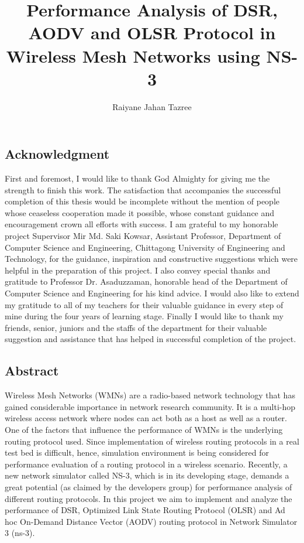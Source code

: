 \documentclass[12pt,a4paper]{report}
\author{Raiyane Jahan Tazree}
\title{Performance Analysis of DSR, AODV and OLSR Protocol in Wireless Mesh Networks  using NS-3}
\begin{document}
\maketitle
\tableofcontents
\listoffigures

\newpage
\begin{center}
\section*{Acknowledgment}
\justify
First and foremost, I would like to thank God Almighty for giving me the strength to finish this work. The satisfaction that accompanies the successful completion of this thesis would be incomplete without the mention of people whose ceaseless cooperation made it possible, whose constant guidance and encouragement crown all efforts with success. I am grateful to my honorable project Supervisor Mir Md. Saki Kowsar, Assistant Professor, Department of Computer Science and Engineering, Chittagong University of Engineering and Technology, for the guidance, inspiration and constructive suggestions which were helpful in the preparation of this project. I also convey special thanks and gratitude to Professor Dr. Asaduzzaman, honorable head of the Department of Computer Science and Engineering for his kind advice. I would also like to extend my gratitude to all of my teachers for their valuable guidance in every step of mine during the four years of learning stage. Finally I would like to thank my friends, senior, juniors and the staffs of the department for their valuable suggestion and assistance that has helped in successful completion of the project.
\end{center}


\newpage
\begin{center}
\section*{Abstract}
\justify
Wireless Mesh Networks (WMNs) are a radio-based network technology that has gained considerable importance in network research community. It is a multi-hop wireless access network where nodes can act both as a host as well as a router. One of the factors that influence the performance of WMNs is the underlying routing protocol used. Since implementation of wireless routing protocols in a real test bed is difficult, hence, simulation environment is being considered for performance evaluation of a routing protocol in a wireless scenario. Recently, a new network simulator called NS-3, which is in its developing stage, demands a great potential (as claimed by the developers group) for performance analysis of different routing protocols. In this project we aim to implement and analyze the performance of DSR, Optimized Link State Routing Protocol (OLSR) and Ad hoc On-Demand Distance Vector (AODV) routing protocol in Network Simulator 3 (ns-3).
\end{center}
\end{document}
